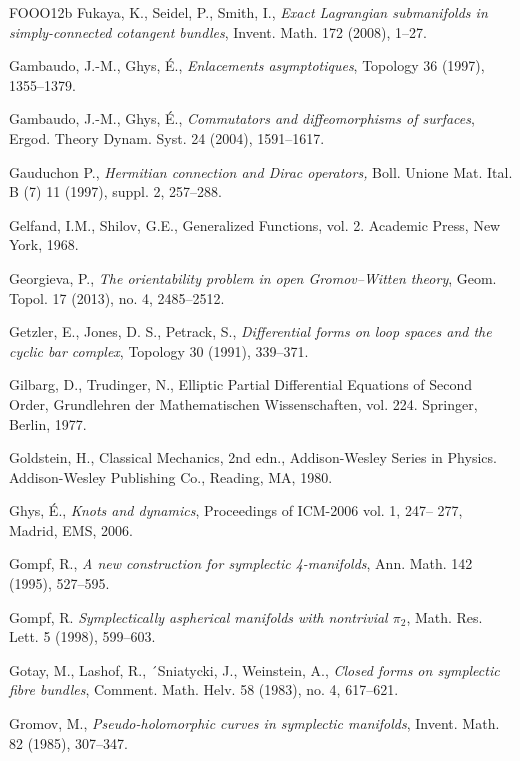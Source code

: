 \begin{thebibliography}{FOOO12b}
 Fukaya, K., Seidel, P., Smith, I., \emph{Exact Lagrangian submanifolds in
  simply-connected cotangent bundles}, Invent. Math. 172 (2008), 1–27.

 Gambaudo, J.-M., Ghys, É., \emph{Enlacements asymptotiques}, Topology 36 (1997),
  1355–1379.

 Gambaudo, J.-M., Ghys, É., \emph{Commutators and diﬀeomorphisms of sur\-faces},
  Ergod. Theory Dynam. Syst. 24 (2004), 1591–1617.

 Gauduchon P., \emph{Hermitian connection and Dirac operators,} Boll. Unione Mat.
  Ital. B (7) 11 (1997), suppl. 2, 257–288.

 Gelfand, I.M., Shilov, G.E., Generalized Functions, vol. 2. Academic Press, New
  York, 1968.

 Georgieva, P., \emph{The orientability problem in open Gromov–Witten theory},
  Geom. Topol. 17 (2013), no. 4, 2485–2512.

 Getzler, E., Jones, D. S., Petrack, S., \emph{Diﬀerential forms on loop spaces and
  the cyclic bar complex}, Topology 30 (1991), 339–371.

 Gilbarg, D., Trudinger, N., Elliptic Partial Diﬀerential Equations of Sec\-ond
  Order, Grundlehren der Mathematischen Wissenschaften, vol. 224. Springer, Berlin, 1977.

 Goldstein, H., Classical Mechanics, 2nd edn., Addison-Wesley Series in Physics.
  Addison-Wesley Publishing Co., Reading, MA, 1980.

 Ghys, É., \emph{Knots and dynamics}, Proceedings of ICM-2006 vol. 1, 247– 277,
  Madrid, EMS, 2006.

 Gompf, R., \emph{A new construction for symplectic 4-manifolds}, Ann. Math. 142
  (1995), 527–595.

 Gompf, R. \emph{Symplectically aspherical manifolds with nontrivial $\pi_2$},
  Math. Res. Lett. 5 (1998), 599–603.

 Gotay, M., Lashof, R., ´Sniatycki, J., Weinstein, A., \emph{Closed forms on
  symplectic fibre bundles}, Comment. Math. Helv. 58 (1983), no. 4, 617–621.

 Gromov, M., \emph{Pseudo-holomorphic curves in symplectic manifolds}, Invent. Math.
  82 (1985), 307–347.


\end{thebibliography}
